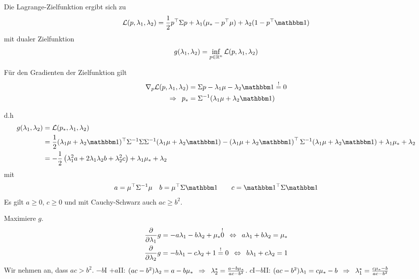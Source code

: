 Die Lagrange-Zielfunktion ergibt sich zu 
\begin{equation*}
	\mathcal{L}(p,\lambda_1,\lambda_2) = \frac{1}{2} \trans{p} \Sigma p + \lambda_1 (\mu_\ast - \trans{p} \mu) + \lambda_2 (1-\trans{p} \one)
\end{equation*}
mit dualer Zielfunktion
\begin{equation*}
	g(\lambda_1, \lambda_2) = \inf_{p \in \mathbb{R}^n} \mathcal{L}(p, \lambda_1, \lambda_2)
\end{equation*}

Für den Gradienten der Zielfunktion gilt
\begin{equation*}
	\begin{aligned}
		\nabla_p \mathcal{L}(p, \lambda_1, \lambda_2) &= \Sigma p - \lambda_1 \mu - \lambda_2 \one \overset{!}{=} 0 \\
		\follows p_\ast &= \Sigma^{-1} (\lambda_1 \mu + \lambda_2 \one)
	\end{aligned}
\end{equation*}

d.h 
\begin{align*}
	g(\lambda_1, \lambda_2) 
	&= \mathcal{L}(p_\ast, \lambda_1, \lambda_2) \\
	&= \frac{1}{2} \trans{(\lambda_1 \mu + \lambda_2 \one)} \Sigma^{-1} \Sigma \Sigma^{-1} (\lambda_1 \mu + \lambda_2 \one) - \transpose{\lambda_1 \mu + \lambda_2 \one} \Sigma^{-1} (\lambda_1 \mu + \lambda_2 \one) + \lambda_1 \mu_\ast + \lambda_2 \\
	&= -\frac{1}{2} \brackets{\lambda_1^2 a + 2 \lambda_1 \lambda_2 b + \lambda_2^2 c} + \lambda_1 \mu_\ast + \lambda_2
\end{align*}
mit
\begin{equation*}
	a = \trans{\mu} \Sigma^{-1} \mu \quad b = \trans{\mu} \Sigma \one \qquad c = \trans{\one} \Sigma \one
\end{equation*}
Es gilt $a \ge 0$, $c \ge 0$ und mit Cauchy-Schwarz auch $ac \ge b^2$.

Maximiere $g$.
\begin{align*}
	\frac{\partial}{\partial \lambda_1 } g = -a \lambda_1 - b \lambda_2 + \mu_\ast \overset{!}{0} \enskip \Leftrightarrow \enskip a \lambda_1 + b \lambda_2 = \mu_\ast \\
	\frac{\partial}{\partial \lambda_2 } g = -b \lambda_1 -c \lambda_2 + 1 \overset{!}{=} 0 \enskip \Leftrightarrow \enskip b \lambda_1 + c \lambda_2 = 1
\end{align*}
Wir nehmen an, dass $ac > b^2$.
$-b$I $+a$II: $(ac - b^2) \lambda_2 = a - b \mu_\ast \enskip \Rightarrow \enskip \lambda_2^\ast = \frac{a - b \mu_\ast}{ac - b^2}$.
$c$I$-b$II: $(ac - b^2) \lambda_1 = c\mu_\ast - b \enskip \Rightarrow \enskip \lambda_1^\ast = \frac{c \mu_\ast - b}{ac - b^2}$

